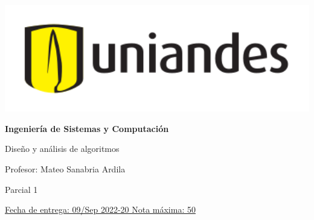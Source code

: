 \documentclass[12pt, a4paper]{exam}
\begin{document}
	\noindent
	\begin{minipage}[l]{0.1\textwidth}
		\noindent
		\includegraphics[width=1.8\textwidth]{Logosimbolo-uniandes_horizontal.png}
	\end{minipage}
\hfill
\begin{minipage}[c]{0.8\textwidth}
	\begin{center}
		{\large \textbf{Ingeniería de Sistemas y Computación} \par
		\large	Diseño y análisis de algoritmos	\par
		\small  Profesor: Mateo Sanabria Ardila	\par
		\small  Parcial 1	\par
		}
	\end{center}
\end{minipage}
\par
\vspace{0.2in}
\noindent
\uline{Fecha de entrega: 09/Sep 	\hfill  2022-20		\hfill Nota máxima: 50}
\par 
\vspace{0.15in}
\noindent
\centering
\end{document}
